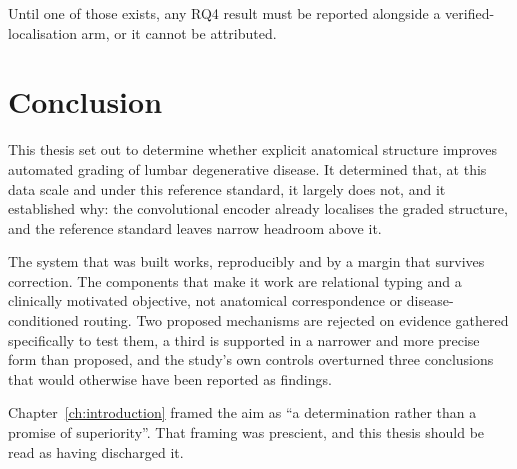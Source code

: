 \documentclass[12pt,a4paper]{report}
\begin{document}
Until one of those exists, any RQ4 result must be reported alongside a
verified-localisation arm, or it cannot be attributed.

\section{Conclusion}
\label{sec:disc-conclusion}

This thesis set out to determine whether explicit anatomical structure improves
automated grading of lumbar degenerative disease. It determined that, at this
data scale and under this reference standard, it largely does not, and it
established why: the convolutional encoder already localises the graded
structure, and the reference standard leaves narrow headroom above it.

The system that was built works, reproducibly and by a margin that survives
correction. The components that make it work are relational typing and a
clinically motivated objective, not anatomical correspondence or
disease-conditioned routing. Two proposed mechanisms are rejected on evidence
gathered specifically to test them, a third is supported in a narrower and more
precise form than proposed, and the study's own controls overturned three
conclusions that would otherwise have been reported as findings.

Chapter~\ref{ch:introduction} framed the aim as \enquote{a determination rather
than a promise of superiority}. That framing was prescient, and this thesis
should be read as having discharged it.
\end{document}
